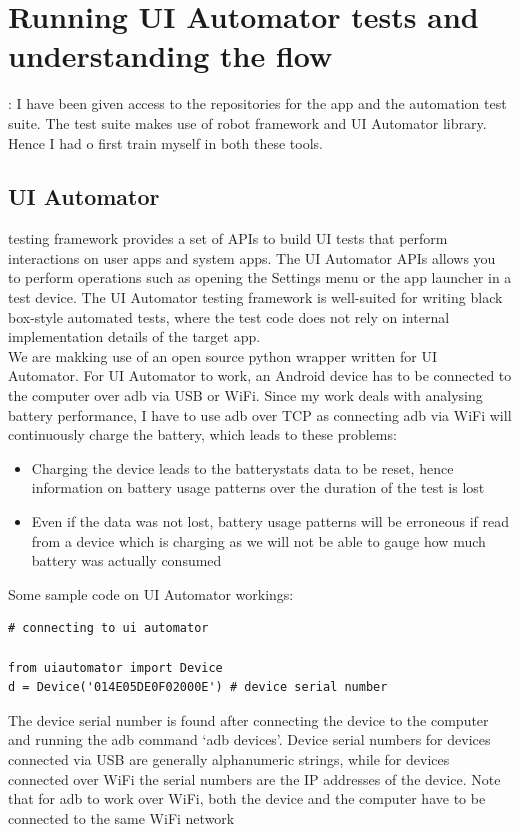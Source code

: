 \section{Running UI Automator tests and understanding the flow}: I have been given access to the repositories for the app and the automation test suite. The test suite makes use of robot framework and UI Automator library. Hence I had o first train myself in both these tools. \\

\subsection{UI Automator} testing framework provides a set of APIs to build UI tests that perform interactions on user apps and system apps. The UI Automator APIs allows you to perform operations such as opening the Settings menu or the app launcher in a test device. The UI Automator testing framework is well-suited for writing black box-style automated tests, where the test code does not rely on internal implementation details of the target app.\cite{uiautomator} \\

We are makking use of an open source python wrapper written for UI Automator. For UI Automator to work, an Android device has to be connected to the computer over adb via USB or WiFi. Since my work deals with analysing battery performance, I have to use adb over TCP as connecting adb via WiFi will continuously charge the battery, which leads to these problems:
\begin{itemize}
	\item Charging the device leads to the batterystats data to be reset, hence information on battery usage patterns over the duration of the test is lost
	\item Even if the data was not lost, battery usage patterns will be erroneous if read from a device which is charging as we will not be able to gauge how much battery was actually consumed
\end{itemize}	 

Some sample code on UI Automator workings:

\begin{lstlisting}[style=PyStyle]
# connecting to ui automator

from uiautomator import Device
d = Device('014E05DE0F02000E') # device serial number 
\end{lstlisting}

The device serial number is found after connecting the device to the computer and running the adb command `adb devices'. Device serial numbers for devices connected via USB are generally alphanumeric strings, while for devices connected over WiFi the serial numbers are the IP addresses of the device. Note that for adb to work over WiFi, both the device and the computer have to be connected to the same WiFi network

